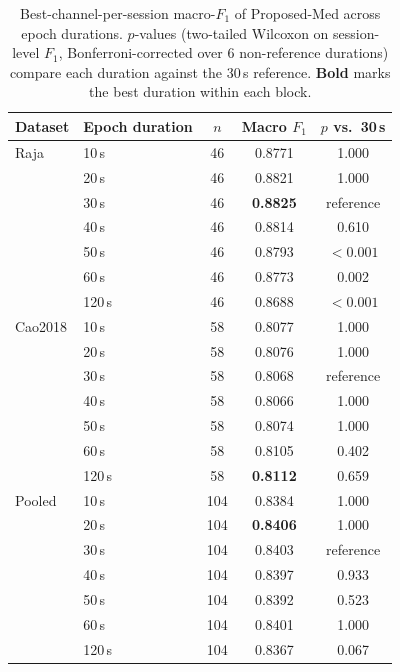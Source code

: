 \begin{table}[ht]
  \centering
  \caption{Best-channel-per-session macro-$F_1$ of Proposed-Med across epoch durations. $p$-values (two-tailed Wilcoxon on session-level $F_1$, Bonferroni-corrected over 6 non-reference durations) compare each duration against the 30\,s reference. \textbf{Bold} marks the best duration within each block.}
  \label{tab:epoch_duration}
  \begin{tabular}{llccc}
    \toprule
    Dataset & Epoch duration & $n$ & Macro $F_1$ & $p$ vs.\ 30\,s \\
    \midrule
    Raja & 10\,s & 46 & 0.8771 & 1.000 \\
     & 20\,s & 46 & 0.8821 & 1.000 \\
     & 30\,s & 46 & \textbf{0.8825} & reference \\
     & 40\,s & 46 & 0.8814 & 0.610 \\
     & 50\,s & 46 & 0.8793 & $<0.001$ \\
     & 60\,s & 46 & 0.8773 & 0.002 \\
     & 120\,s & 46 & 0.8688 & $<0.001$ \\
    \midrule
    Cao2018 & 10\,s & 58 & 0.8077 & 1.000 \\
     & 20\,s & 58 & 0.8076 & 1.000 \\
     & 30\,s & 58 & 0.8068 & reference \\
     & 40\,s & 58 & 0.8066 & 1.000 \\
     & 50\,s & 58 & 0.8074 & 1.000 \\
     & 60\,s & 58 & 0.8105 & 0.402 \\
     & 120\,s & 58 & \textbf{0.8112} & 0.659 \\
    \midrule
    Pooled & 10\,s & 104 & 0.8384 & 1.000 \\
     & 20\,s & 104 & \textbf{0.8406} & 1.000 \\
     & 30\,s & 104 & 0.8403 & reference \\
     & 40\,s & 104 & 0.8397 & 0.933 \\
     & 50\,s & 104 & 0.8392 & 0.523 \\
     & 60\,s & 104 & 0.8401 & 1.000 \\
     & 120\,s & 104 & 0.8367 & 0.067 \\
    \bottomrule
  \end{tabular}
\end{table}
